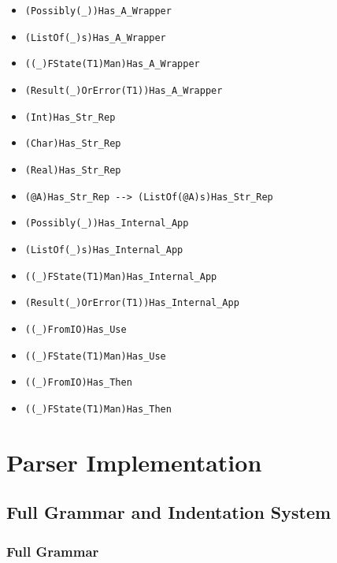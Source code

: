 \documentclass[diploma]{softlab-thesis}
\begin{document}
\begin{itemize}
  \begin{itemize}
  \item \verb|(Possibly(_))Has_A_Wrapper|
  \item \verb|(ListOf(_)s)Has_A_Wrapper|
  \item \verb|((_)FState(T1)Man)Has_A_Wrapper|
  \item \verb|(Result(_)OrError(T1))Has_A_Wrapper|
  \item \verb|(Int)Has_Str_Rep|
  \item \verb|(Char)Has_Str_Rep|
  \item \verb|(Real)Has_Str_Rep|
  \item \verb|(@A)Has_Str_Rep --> (ListOf(@A)s)Has_Str_Rep|
  \item \verb|(Possibly(_))Has_Internal_App|
  \item \verb|(ListOf(_)s)Has_Internal_App|
  \item \verb|((_)FState(T1)Man)Has_Internal_App|
  \item \verb|(Result(_)OrError(T1))Has_Internal_App|
  \item \verb|((_)FromIO)Has_Use|
  \item \verb|((_)FState(T1)Man)Has_Use|
  \item \verb|((_)FromIO)Has_Then|
  \item \verb|((_)FState(T1)Man)Has_Then|
  \end{itemize}

\end{itemize}

\newpage

\chapter{Parser Implementation}

\section{Full Grammar and Indentation System}

\subsection{Full Grammar}
\label{subsec:fullgrammar}
\end{document}
